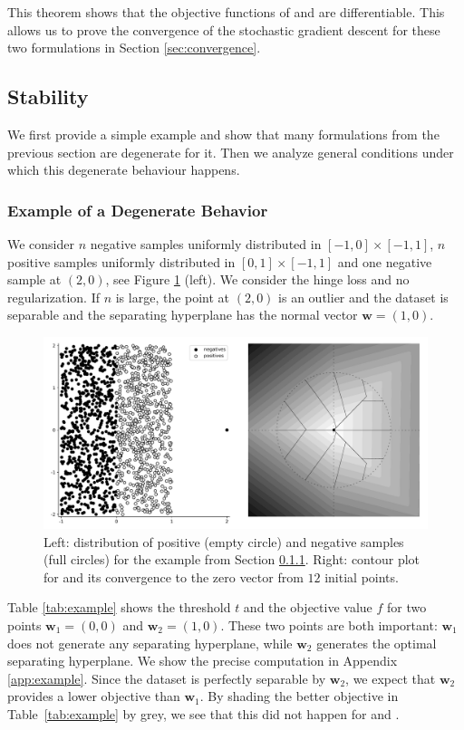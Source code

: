\noindent This theorem shows that the objective functions of \PatMat and \PatMatNP are differentiable. This allows us to prove the convergence of the stochastic gradient descent for these two formulations in Section \ref{sec:convergence}.

\subsection{Stability}\label{sec:stability}

We first provide a simple example and show that many formulations from the previous section are degenerate for it. Then we analyze general conditions under which this degenerate behaviour happens.

\subsubsection{Example of a Degenerate Behavior}\label{sec:example}

We consider $n$ negative samples uniformly distributed in $[-1,0]\times[-1,1]$, $n$ positive samples uniformly distributed in $[0,1]\times[-1,1]$ and one negative sample at $(2,0)$, see Figure \ref{fig:example} (left). We consider the hinge loss and no regularization. If $n$ is large, the point at $(2,0)$ is an outlier and the dataset is separable and the separating hyperplane has the normal vector $\bm{w}=(1,0)$. 

\begin{figure}[!ht]
  \centering
  \includegraphics[width=0.7\linewidth]{images/toppush_convergence.pdf}
  \caption{Left: distribution of positive (empty circle) and negative samples (full circles) for the example from Section \ref{sec:example}. Right: contour plot for \TopPush and its convergence to the zero vector from $12$ initial points.}
  \label{fig:example}
\end{figure}

Table \ref{tab:example} shows the threshold $t$ and the objective value $f$ for two points $\bm{w}_1=(0,0)$ and $\bm{w}_2=(1,0)$. These two points are both important: $\bm{w}_1$ does not generate any separating hyperplane, while $\bm{w}_2$ generates the optimal separating hyperplane. We show the precise computation in Appendix \ref{app:example}. Since the dataset is perfectly separable by $\bm{w}_2$, we expect that $\bm{w}_2$ provides a lower objective than $\bm{w}_1$. By shading the better objective in Table~\ref{tab:example} by grey, we see that this did not happen for \TopPush and \TopMeanK.


